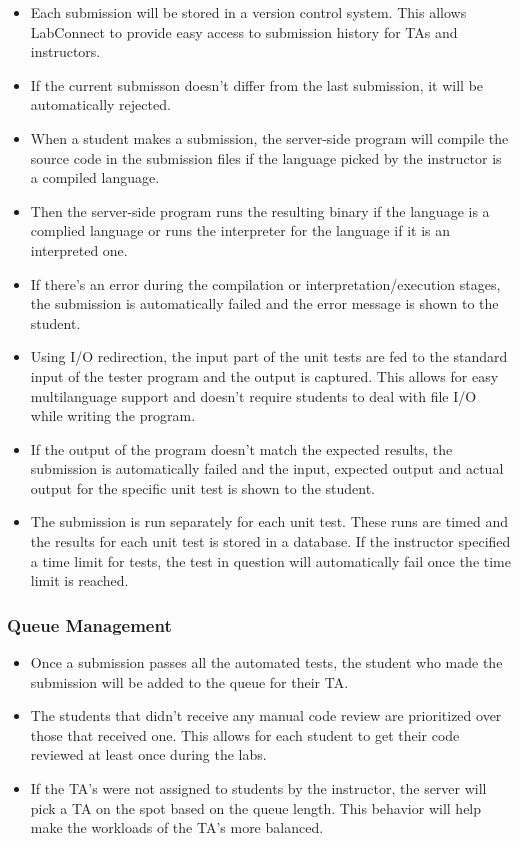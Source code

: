 \documentclass[a4paper, 12pt]{article}
\begin{document}
    \begin{itemize}
      \item Each submission will be stored in a version control system. This allows LabConnect to provide easy access to
      submission history for TAs and instructors.
      \item If the current submisson doesn't differ from the last submission, it will be automatically rejected.
      \item When a student makes a submission, the server-side program will compile the source code in the submission
      files if the language picked by the instructor is a compiled language.
      \item Then the server-side program runs the resulting binary if the language is a complied language or runs the
      interpreter for the language if it is an interpreted one.
      \item If there's an error during the compilation or interpretation/execution stages, the submission is automatically failed and
      the error message is shown to the student.
      \item Using I/O redirection, the input part of the unit tests are fed to the standard input of the tester program and the output is captured.
      This allows for easy multilanguage support and doesn't require students to deal with file I/O while writing the program.
      \item If the output of the program doesn't match the expected results, the submission is automatically failed and the input, expected
      output and actual output for the specific unit test is shown to the student.
      \item The submission is run separately for each unit test. These runs are timed and the results for each unit test is stored in a database.
      If the instructor specified a time limit for tests, the test in question will automatically fail once the time limit is reached.
    \end{itemize}

    \subsubsection{Queue Management}
    \begin{itemize}
      \item Once a submission passes all the automated tests, the student who made the submission will be added to the queue for their TA.
      \item The students that didn't receive any manual code review are prioritized over those that received one. This allows for each student to
      get their code reviewed at least once during the labs.
      \item If the TA's were not assigned to students by the instructor, the server will pick a TA on the spot based on the queue length. This
      behavior will help make the workloads of the TA's more balanced.
    \end{itemize}
\end{document}
